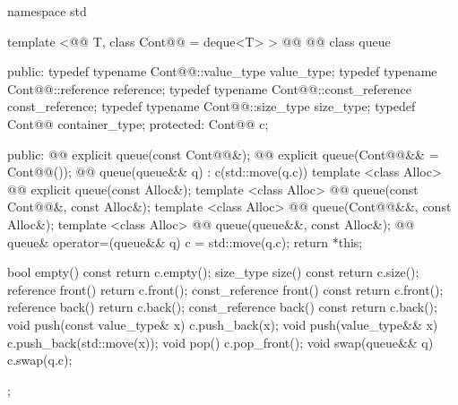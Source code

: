 \documentclass[american,twoside]{book}
\begin{document}
\begin{codeblock}
namespace std {
  template <@@ T, class Cont@@ = deque<T> >
  @@
          @@
  class queue {
  public:
    typedef typename Cont@@::value_type            value_type;
    typedef typename Cont@@::reference             reference;
    typedef typename Cont@@::const_reference       const_reference;
    typedef typename Cont@@::size_type             size_type;
    typedef          Cont@@                        container_type;
  protected:
    Cont@@ c;

  public:
    @@ explicit queue(const Cont@@&);
    @@ explicit queue(Cont@@&& = Cont@@());
    @@ queue(queue&& q) : c(std::move(q.c)) {}
    template <class Alloc> 
      @@
      explicit queue(const Alloc&);
    template <class Alloc> 
      @@
      queue(const Cont@@&, const Alloc&);
    template <class Alloc> 
      @@
      queue(Cont@@&&, const Alloc&);
    template <class Alloc> 
      @@
      queue(queue&&, const Alloc&);
    @@ queue& operator=(queue&& q)
                                        { c = std::move(q.c); return *this; }

    bool              empty() const     { return c.empty(); }
    size_type         size()  const     { return c.size(); }
    reference         front()           { return c.front(); }
    const_reference   front() const     { return c.front(); }
    reference         back()            { return c.back(); }
    const_reference   back() const      { return c.back(); }
    void push(const value_type& x)      { c.push_back(x); }
    void push(value_type&& x)           { c.push_back(std::move(x)); }
    void pop()                          { c.pop_front(); }
    void swap(queue&& q)                { c.swap(q.c); }
  };

}
\end{codeblock}
\end{document}
